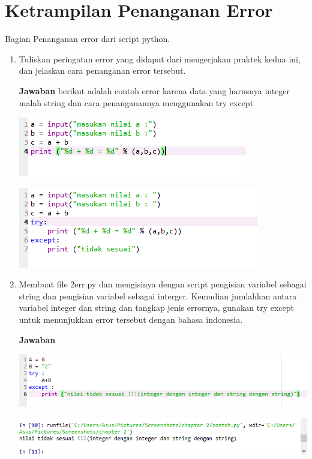 \section{Ketrampilan Penanganan Error}
Bagian Penanganan error dari script python.
\begin{enumerate}
\item
Tuliskan peringatan error yang didapat dari mengerjakan praktek kedua ini, dan jelaskan cara penanganan error tersebut.
\par\textbf{Jawaban} berikut adalah contoh error karena data yang harusnya integer malah string dan cara penanganannya menggunakan try except
    \begin{center}
        \centering
        \includegraphics[scale=0.7]{figures/chapter 2/21.PNG}
    \end{center}

    \begin{center}
        \centering
        \includegraphics[scale=0.7]{figures/chapter 2/23.PNG}
    \end{center}
\item
Membuat file 2err.py dan mengisinya dengan script pengisian variabel sebagai string dan pengisian variabel sebagai interger. 
Kemudian jumlahkan antara variabel integer dan string dan tangkap jenis errornya, gunakan try except untuk menunjukkan error tersebut dengan
bahasa indonesia.
\par\textbf{Jawaban}
    \begin{center}
        \centering
        \includegraphics[scale=0.7]{figures/chapter 2/24.PNG}
    \end{center}

    \begin{center}
        \centering
        \includegraphics[scale=0.7]{figures/chapter 2/25.PNG}
    \end{center}
\end{enumerate}



